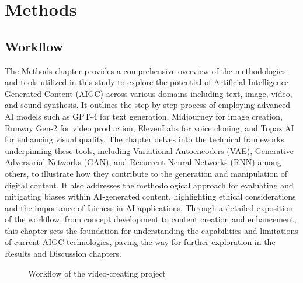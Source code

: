 \documentclass[11pt,a4paper,oneside]{report}
\begin{document}
\chapter{Methods}

\section{Workflow}

The Methods chapter provides a comprehensive overview of the methodologies and tools utilized in this study to explore the potential of Artificial Intelligence Generated Content (AIGC) across various domains including text, image, video, and sound synthesis. 
It outlines the step-by-step process of employing advanced AI models such as GPT-4 for text generation, Midjourney for image creation, Runway Gen-2 for video production, ElevenLabs for voice cloning, and Topaz AI for enhancing visual quality. 
The chapter delves into the technical frameworks underpinning these tools, including Variational Autoencoders (VAE), Generative Adversarial Networks (GAN), and Recurrent Neural Networks (RNN) among others, to illustrate how they contribute to the generation and manipulation of digital content. 
It also addresses the methodological approach for evaluating and mitigating biases within AI-generated content, highlighting ethical considerations and the importance of fairness in AI applications. 
Through a detailed exposition of the workflow, from concept development to content creation and enhancement, this chapter sets the foundation for understanding the capabilities and limitations of current AIGC technologies, paving the way for further exploration in the Results and Discussion chapters.

\begin{figure}[H]
\centering
{}
\caption{Workflow of the video-creating project}
\end{figure}
\end{document}
